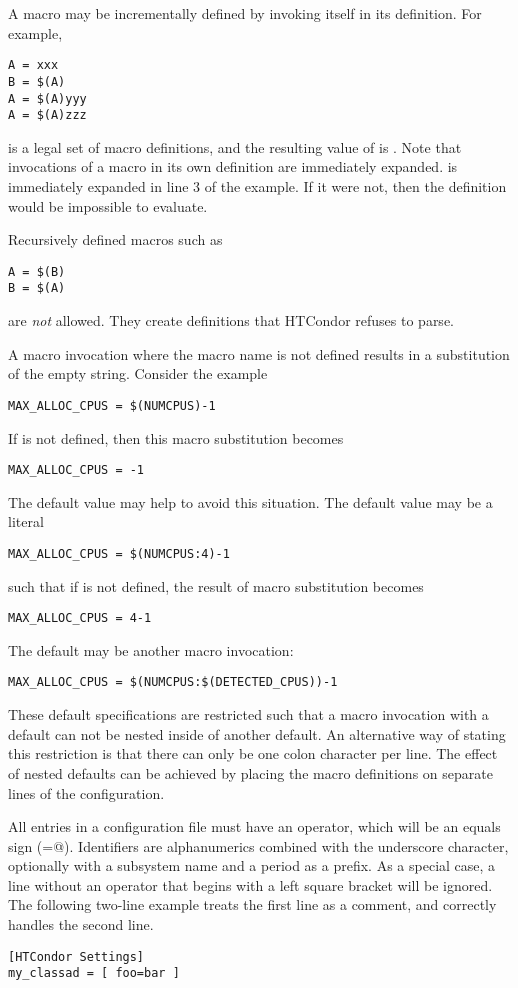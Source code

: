 A macro may be incrementally defined by invoking itself in its
definition.  For example,
\begin{verbatim}
A = xxx
B = $(A)
A = $(A)yyy
A = $(A)zzz
\end{verbatim}
is a legal set of macro definitions, and the resulting value of 
is .
Note that invocations of a macro in
its own definition are immediately
expanded.
 is immediately expanded in line 3 of the example.
If it were not, then the definition would be impossible to
evaluate.

Recursively defined macros such as
\begin{verbatim}
A = $(B)
B = $(A)
\end{verbatim}
are \emph{not} allowed.
They create definitions that HTCondor refuses to parse. 

A macro invocation where the macro name is not defined results
in a substitution of the empty string.
Consider the example
\begin{verbatim}
MAX_ALLOC_CPUS = $(NUMCPUS)-1
\end{verbatim}
If  is not defined, then this macro substitution
becomes
\begin{verbatim}
MAX_ALLOC_CPUS = -1
\end{verbatim}
The default value may help to avoid this situation.
The default value may be a literal
\begin{verbatim}
MAX_ALLOC_CPUS = $(NUMCPUS:4)-1
\end{verbatim}
such that if  is not defined, the result of macro
substitution becomes
\begin{verbatim}
MAX_ALLOC_CPUS = 4-1
\end{verbatim}
The default may be another macro invocation:
\begin{verbatim}
MAX_ALLOC_CPUS = $(NUMCPUS:$(DETECTED_CPUS))-1
\end{verbatim}
These default specifications are restricted such that 
a macro invocation with a default can not be nested inside of another default.  
An alternative way of stating this restriction is that there can
only be one colon character per line. 
The effect of nested defaults can be achieved by placing the
macro definitions on separate lines of the configuration.

All entries in a configuration file must have an operator,
which will be an equals sign (\verb@=@).
Identifiers are alphanumerics combined with the underscore character,
optionally with a subsystem name and a period as a prefix.
As a special case,
a line without an operator that begins with a left square bracket
will be ignored.
The following two-line example treats the first line as a comment,
and correctly handles the second line.
\begin{verbatim}
[HTCondor Settings]
my_classad = [ foo=bar ]
\end{verbatim}

